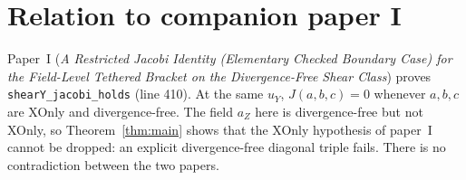 \documentclass[11pt]{article}\emergencystretch=2em
\theoremstyle{definition}\newtheorem{definition}[theorem]{Definition}\theoremstyle{remark}\newtheorem{remark}[theorem]{Remark}
\begin{document}
\section{Relation to companion paper I}
Paper~I (\emph{A Restricted Jacobi Identity (Elementary Checked Boundary Case) for the Field-Level Tethered Bracket on the Divergence-Free Shear Class}) proves \texttt{shearY\_jacobi\_holds} (line 410). At the same $u_Y$, $J(a,b,c)=0$ whenever $a,b,c$ are XOnly and divergence-free. The field $a_Z$ here is divergence-free but not XOnly, so Theorem~\ref{thm:main} shows that the XOnly hypothesis of paper~I cannot be dropped: an explicit divergence-free diagonal triple fails. There is no contradiction between the two papers.
\end{document}
